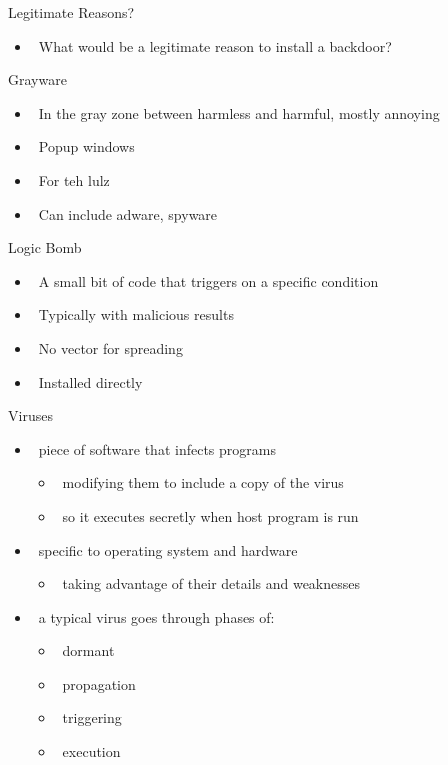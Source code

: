 \documentclass{beamer}
\begin{document}
\begin{frame}{Legitimate Reasons?}
  \begin{itemize}
  \item  What would be a legitimate reason to install a 
backdoor?  
  \end{itemize}
\end{frame}
 
\begin{frame}{Grayware}
  \begin{itemize}
  \item  In the gray zone between harmless and 
    harmful, mostly annoying 
  \item  Popup windows 
  \item  For teh lulz 
  \item  Can include adware, spyware
  \end{itemize}
\end{frame}

\begin{frame}{Logic Bomb }
  \begin{itemize}
  \item  A small bit of code that triggers on a specific 
    condition 
  \item  Typically with malicious results 
  \item  No vector for spreading 
  \item  Installed directly
  \end{itemize}
\end{frame}

\begin{frame}{Viruses }
  \begin{itemize}
  \item  piece of software that infects programs 
    \begin{itemize}
    \item  modifying them to include a copy of the virus 
    \item  so it executes secretly when host program is run 
    \end{itemize}
  \item  specific to operating system and hardware 
    \begin{itemize}
    \item  taking advantage of their details and weaknesses 
    \end{itemize}
  \item  a typical virus goes through phases of: 
    \begin{itemize}
    \item  dormant 
    \item  propagation 
    \item  triggering 
    \item  execution
    \end{itemize}
  \end{itemize}
\end{frame}
\end{document}
